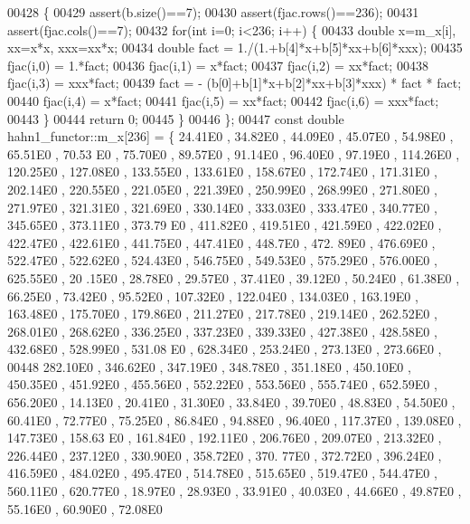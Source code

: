 \begin{DoxyCode}
00428     \{
00429         assert(b.size()==7);
00430         assert(fjac.rows()==236);
00431         assert(fjac.cols()==7);
00432         \textcolor{keywordflow}{for}(\textcolor{keywordtype}{int} i=0; i<236; i++) \{
00433             \textcolor{keywordtype}{double} x=m\_x[i], xx=x*x, xxx=xx*x;
00434             \textcolor{keywordtype}{double} fact = 1./(1.+b[4]*x+b[5]*xx+b[6]*xxx);
00435             fjac(i,0) = 1.*fact;
00436             fjac(i,1) = x*fact;
00437             fjac(i,2) = xx*fact;
00438             fjac(i,3) = xxx*fact;
00439             fact = - (b[0]+b[1]*x+b[2]*xx+b[3]*xxx) * fact * fact;
00440             fjac(i,4) = x*fact;
00441             fjac(i,5) = xx*fact;
00442             fjac(i,6) = xxx*fact;
00443         \}
00444         \textcolor{keywordflow}{return} 0;
00445     \}
00446 \};
00447 \textcolor{keyword}{const} \textcolor{keywordtype}{double} hahn1\_functor::m\_x[236] = \{ 24.41E0 , 34.82E0 , 44.09E0 , 45.07E0 , 54.98E0 , 65.51E0 , 70.53
      E0 , 75.70E0 , 89.57E0 , 91.14E0 , 96.40E0 , 97.19E0 , 114.26E0 , 120.25E0 , 127.08E0 , 133.55E0 , 133.61E0 ,
       158.67E0 , 172.74E0 , 171.31E0 , 202.14E0 , 220.55E0 , 221.05E0 , 221.39E0 , 250.99E0 , 268.99E0 , 271.80E0
       , 271.97E0 , 321.31E0 , 321.69E0 , 330.14E0 , 333.03E0 , 333.47E0 , 340.77E0 , 345.65E0 , 373.11E0 , 373.79
      E0 , 411.82E0 , 419.51E0 , 421.59E0 , 422.02E0 , 422.47E0 , 422.61E0 , 441.75E0 , 447.41E0 , 448.7E0  , 472.
      89E0 , 476.69E0 , 522.47E0 , 522.62E0 , 524.43E0 , 546.75E0 , 549.53E0 , 575.29E0 , 576.00E0 , 625.55E0 , 20
      .15E0 , 28.78E0 , 29.57E0 , 37.41E0 , 39.12E0 , 50.24E0 , 61.38E0 , 66.25E0 , 73.42E0 , 95.52E0 , 107.32E0 ,
       122.04E0 , 134.03E0 , 163.19E0 , 163.48E0 , 175.70E0 , 179.86E0 , 211.27E0 , 217.78E0 , 219.14E0 , 262.52E0
       , 268.01E0 , 268.62E0 , 336.25E0 , 337.23E0 , 339.33E0 , 427.38E0 , 428.58E0 , 432.68E0 , 528.99E0 , 531.08
      E0 , 628.34E0 , 253.24E0 , 273.13E0 , 273.66E0 ,
00448 282.10E0 , 346.62E0 , 347.19E0 , 348.78E0 , 351.18E0 , 450.10E0 , 450.35E0 , 451.92E0 , 455.56E0 , 552.22E0
       , 553.56E0 , 555.74E0 , 652.59E0 , 656.20E0 , 14.13E0 , 20.41E0 , 31.30E0 , 33.84E0 , 39.70E0 , 48.83E0 , 
      54.50E0 , 60.41E0 , 72.77E0 , 75.25E0 , 86.84E0 , 94.88E0 , 96.40E0 , 117.37E0 , 139.08E0 , 147.73E0 , 158.63
      E0 , 161.84E0 , 192.11E0 , 206.76E0 , 209.07E0 , 213.32E0 , 226.44E0 , 237.12E0 , 330.90E0 , 358.72E0 , 370.
      77E0 , 372.72E0 , 396.24E0 , 416.59E0 , 484.02E0 , 495.47E0 , 514.78E0 , 515.65E0 , 519.47E0 , 544.47E0 , 
      560.11E0 , 620.77E0 , 18.97E0 , 28.93E0 , 33.91E0 , 40.03E0 , 44.66E0 , 49.87E0 , 55.16E0 , 60.90E0 , 72.08E0 

\end{DoxyCode}
